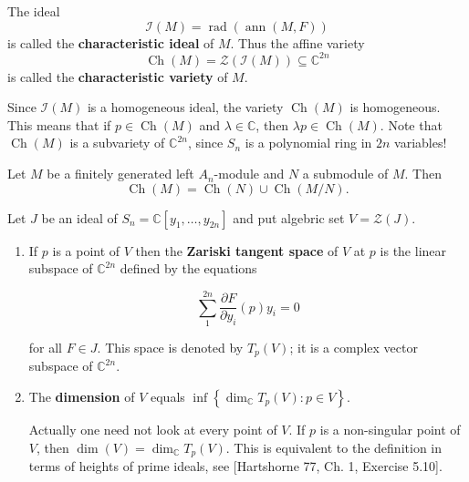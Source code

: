 \documentclass[12pt, oneside]{book}
\begin{document}
\begin{definition}
    The ideal
    \begin{equation*}
        \mathcal{I}(M)=\operatorname{rad}(\operatorname{ann}(M, F))
    \end{equation*}
    is called the \textbf{characteristic ideal} of $M$.
    Thus the affine variety
    \begin{equation*}
        \operatorname{Ch}(M)=\mathcal{Z}(\mathcal{I}(M)) \subseteq \mathbb{C}^{2 n}
    \end{equation*}
    is called the \textbf{characteristic variety} of $M$.
    \begin{remark}
        Since $\mathcal{I}(M)$ is a homogeneous ideal, the variety $\operatorname{Ch}(M)$ is homogeneous. This means that if $p \in \operatorname{Ch}(M)$ and $\lambda \in \mathbb{C}$, then $\lambda p \in \operatorname{Ch}(M)$. Note that $\operatorname{Ch}(M)$ is a subvariety of $\mathbb{C}^{2 n}$, since $S_n$ is a polynomial ring in $2 n$ variables!
    \end{remark}
\end{definition}


\begin{proposition}
    Let $M$ be a finitely generated left $A_n$-module and $N$ a submodule of $M$. Then
    \begin{equation*}
        \operatorname{Ch}(M)=\operatorname{Ch}(N) \cup \operatorname{Ch}(M / N) .
    \end{equation*}
\end{proposition}


\begin{definition}
    Let $J$ be an ideal of $S_n=\mathbb{C}\left[y_1, \ldots, y_{2 n}\right]$ and put algebric set $V=\mathcal{Z}(J)$.
    \begin{enumerate}
        \item
              If $p$ is a point of $V$ then the \textbf{Zariski tangent space} of $V$ at $p$ is the linear subspace of $\mathbb{C}^{2 n}$ defined by the equations

              \begin{equation*}
                  \sum_1^{2 n} \frac{\partial F}{\partial y_i}(p) y_i=0
              \end{equation*}

              for all $F \in J$. This space is denoted by $T_p(V)$; it is a complex vector subspace of $\mathbb{C}^{2 n}$.

        \item
              The \textbf{dimension} of $V$ equals $\inf \left\{\operatorname{dim}_{\mathbb{C}} T_p(V): p \in V\right\}$.
              \begin{remark}
                  Actually one need not look at every point of $V$. If $p$ is a non-singular point of $V$, then $\operatorname{dim}(V)=\operatorname{dim}_{\mathbb{C}} T_p(V)$. This is equivalent to the definition in terms of heights of prime ideals, see [Hartshorne 77, Ch. 1, Exercise 5.10].
              \end{remark}
    \end{enumerate}
\end{definition}
\end{document}
